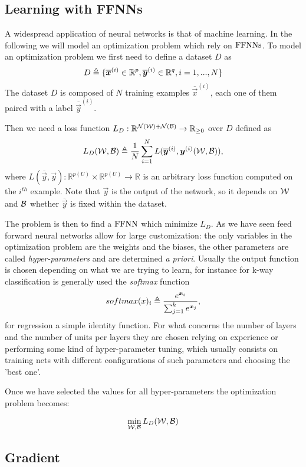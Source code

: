 \subsection{Learning with FFNNs}
A widespread application of neural networks is that of machine learning. In the following we will model an optimization problem which rely on $\mathrm{FFNNs}$.
To model an optimization problem we first need to define a dataset $D$ as 
\begin{equation}
D\triangleq\{\overline{\boldsymbol{x}}^{(i)} \in \mathbb{R}^p, \overline{\boldsymbol{y}}^{(i)} \in \mathbb{R}^q,  i=1,...,N\}
\end{equation}
The dataset $D$ is composed of $N$ training examples $\overline{\vec{x}}^{(i)}$, each one of them paired with a label $\overline{\vec{y}}^{(i)}$.

Then we need a loss function $L_D:\mathbb{R}^{\mathcal{N}(\mathcal{W})+\mathcal{N}(\mathcal{B})} \rightarrow \mathbb{R}_{\geq 0}$ over $D$ defined as
\begin{equation}
L_D(\mathcal{W},\mathcal{B})\triangleq\frac{1}{N}\sum_{i=1}^N L(\overline{\boldsymbol{y}}^{(i)},\boldsymbol{y}^{(i)}(\mathcal{W},\mathcal{B})), 
\end{equation}
where $L(\overline{\vec{y}},\vec{y}):\mathbb{R}^{p(U)} \times \mathbb{R}^{p(U)} \rightarrow \mathbb{R}$ is an arbitrary loss function computed on the $i^{th}$ example. Note that $\vec{y}$ is the output of the
network, so it depends on $\mathcal{W}$ and $\mathcal{B}$ whether $\overline{\vec{y}}$ is fixed within the dataset.


The problem is then to find a $\mathrm{FFNN}$ which minimize $L_D$. As we have seen feed forward neural networks allow for large customization: the only variables in the optimization problem are the weights
and the biases, the other
parameters are called \textit{hyper-parameters} and are determined \textit{a priori}. Usually the output function is chosen depending on what we are trying to learn, for instance for k-way classification
is generally used the \textit{softmax} function \begin{equation}
softmax(x)_i\triangleq \frac{e^{\boldsymbol{x}_i}}{\sum_{j=1}^k e^{\boldsymbol{x}_j} },
\end{equation} for regression a simple identity function.
For what concerns the number of layers and the number of units per layers they are chosen relying on experience or performing some kind of hyper-parameter tuning, which usually consists on training nets
with different configurations of such parameters and choosing the 'best one'.

Once we have selected the values for all hyper-parameters the optimization problem becomes:

\begin{equation}
\min_{\mathcal{W},\mathcal{B}} L_D(\mathcal{W},\mathcal{B}) \\
\end{equation}


\subsection{Gradient}


